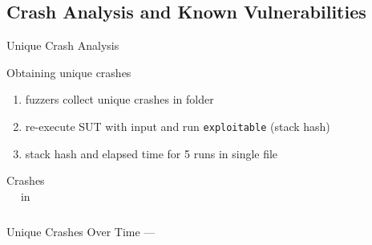 \documentclass[\HandoutMode,table]{beamer}
\newcommand\figwidth\textwidth
\begin{document}
\subsection{Crash Analysis and Known Vulnerabilities}

\begin{frame}
    {Unique Crash Analysis}
    \begin{block}{Obtaining unique crashes}
        \begin{enumerate}
            \item{} fuzzers collect unique crashes in folder
            \item{} re-execute SUT with input and run \texttt{exploitable} (stack hash)
            \item{} stack hash and elapsed time for 5 runs in single file
        \end{enumerate}
    \end{block}
    \vspace{\baselineskip}
    \begin{table}
        \begin{tabular}{l c c c c}
            
        \end{tabular}
        \caption{Crashes in \listswf}
    \end{table}
\end{frame}

\begin{frame}
    {Unique Crashes Over Time --- \listswf}
    \renewcommand\figwidth{.32\textwidth}
    \setcounter{subfigure}{0}
    \captionsetup[subfigure]{margin=3pt}
    \begin{figure}
    \end{figure}
\end{frame}
\end{document}
